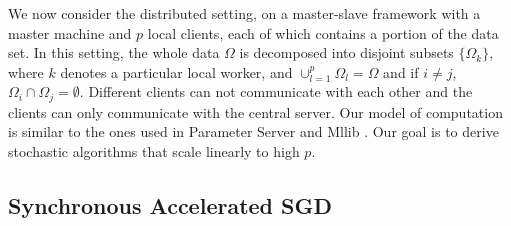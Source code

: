 We now consider the distributed setting, on a master-slave framework with a master machine and $p$ local clients, each of which contains a portion of
the data set. In this setting, the whole data $\Omega$ is decomposed into disjoint
subsets $\{\Omega_k\}$,  where $k$ denotes  a  particular  local  worker,
and $\cup_{l=1}^p{\Omega_l} = \Omega$ and if $i\neq j$, $\Omega_i\cap\Omega_j = \emptyset$. Different clients can not communicate with each other and the  clients  can
only communicate with the central server. Our model of
computation is similar to the ones used in Parameter
Server \cite{Li2014} and Mllib \cite{Meng2016Spark}. Our goal is to
derive stochastic algorithms that scale linearly to high $p$.

\subsection{Synchronous Accelerated SGD}

